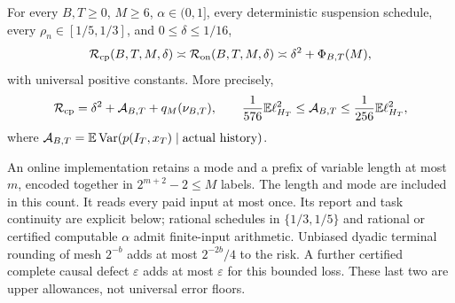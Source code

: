 \begin{theorem}\label{thm:recurrent-acquisition}
For every $B,T\ge0$, $M\ge6$, $\alpha\in(0,1]$, every deterministic suspension schedule, every $\rho_n\in[1/5,1/3]$, and $0\le\delta\le1/16$,
\begin{equation}\label{eq:ra-main}
 \mathcal R_{\mathrm{cp}}(B,T,M,\delta)\asymp
 \mathcal R_{\mathrm{on}}(B,T,M,\delta)\asymp
                     \delta^2+\Phi_{B,T}(M),
\end{equation}
with universal positive constants. More precisely,
\begin{equation}\label{eq:ra-exact-cp}
 \mathcal R_{\mathrm{cp}}=\delta^2+\mathcal A_{B,T}+q_M(\nu_{B,T}),\qquad
 \frac1{576}\mathbb E\ell_{H_T}^2\le\mathcal A_{B,T}
                              \le\frac1{256}\mathbb E\ell_{H_T}^2,
\end{equation}
where $\mathcal A_{B,T}=\mathbb E\operatorname{Var}(p(I_T,x_T)\mid\text{actual history})$.

An online implementation retains a mode and a prefix of variable length at most $m$, encoded together in $2^{m+2}-2\le M$ labels. The length and mode are included in this count. It reads every paid input at most once. Its report and task continuity are explicit below; rational schedules in $\{1/3,1/5\}$ and rational or certified computable $\alpha$ admit finite-input arithmetic. Unbiased dyadic terminal rounding of mesh $2^{-b}$ adds at most $2^{-2b}/4$ to the risk. A further certified complete causal defect $\varepsilon$ adds at most $\varepsilon$ for this bounded loss. These last two are upper allowances, not universal error floors.
\end{theorem}
